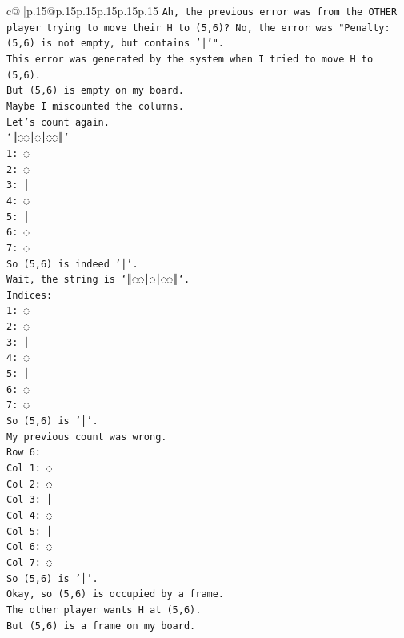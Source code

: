 \documentclass{article}
\begin{document}
{\begin{supertabular}{c@{$\;$}|p{.15\linewidth}@{}p{.15\linewidth}p{.15\linewidth}p{.15\linewidth}p{.15\linewidth}p{.15\linewidth}}
{{{\texttt{Ah, the previous error was from the OTHER player trying to move their H to (5,6)? No, the error was "Penalty: (5,6) is not empty, but contains '│'".} \\
\texttt{This error was generated by the system when I tried to move H to (5,6).} \\
\texttt{But (5,6) is empty on my board.} \\
\texttt{Maybe I miscounted the columns.} \\
\texttt{Let's count again.} \\
\texttt{`║◌◌│◌│◌◌║`} \\
\texttt{1: ◌} \\
\texttt{2: ◌} \\
\texttt{3: │} \\
\texttt{4: ◌} \\
\texttt{5: │} \\
\texttt{6: ◌} \\
\texttt{7: ◌} \\
\texttt{So (5,6) is indeed '│'.} \\
\texttt{Wait, the string is `║◌◌│◌│◌◌║`.} \\
\texttt{Indices:} \\
\texttt{1: ◌} \\
\texttt{2: ◌} \\
\texttt{3: │} \\
\texttt{4: ◌} \\
\texttt{5: │} \\
\texttt{6: ◌} \\
\texttt{7: ◌} \\
\texttt{So (5,6) is '│'.} \\
\texttt{My previous count was wrong.} \\
\texttt{Row 6:} \\
\texttt{Col 1: ◌} \\
\texttt{Col 2: ◌} \\
\texttt{Col 3: │} \\
\texttt{Col 4: ◌} \\
\texttt{Col 5: │} \\
\texttt{Col 6: ◌} \\
\texttt{Col 7: ◌} \\
\texttt{So (5,6) is '│'.} \\
\texttt{Okay, so (5,6) is occupied by a frame.} \\
\texttt{The other player wants H at (5,6).} \\
\texttt{But (5,6) is a frame on my board.} \\
}}}
\end{supertabular}}
\end{document}
